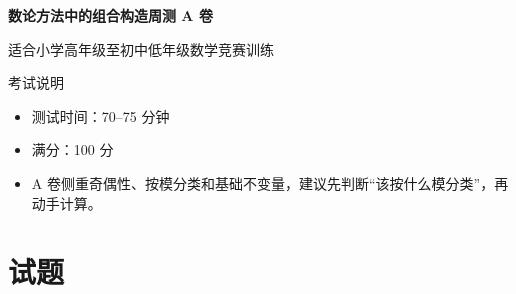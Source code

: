 \documentclass[11pt,a4paper,fontset=fandol]{ctexart}
\begin{document}
\thispagestyle{empty}
\begin{center}
{\fontsize{22}{28}\selectfont\bfseries 数论方法中的组合构造周测 A 卷\par}
\vspace{0.4cm}
{\large 适合小学高年级至初中低年级数学竞赛训练\par}
\end{center}

\begin{infobox}{考试说明}
\begin{itemize}
  \item 测试时间：70--75 分钟
  \item 满分：100 分
  \item A 卷侧重奇偶性、按模分类和基础不变量，建议先判断“该按什么模分类”，再动手计算。
\end{itemize}
\end{infobox}

\section{试题}
\end{document}
